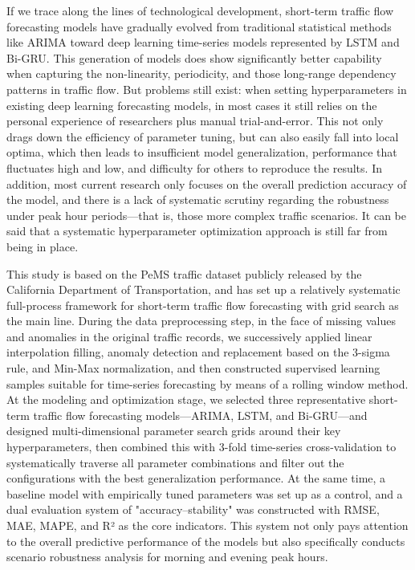 \documentclass[12pt,a4paper,oneside]{ctexbook}
\begin{document}
	If we trace along the lines of technological development, short-term traffic flow forecasting models have gradually evolved from traditional statistical methods like ARIMA toward deep learning time-series models represented by LSTM and Bi-GRU. This generation of models does show significantly better capability when capturing the non-linearity, periodicity, and those long-range dependency patterns in traffic flow. But problems still exist: when setting hyperparameters in existing deep learning forecasting models, in most cases it still relies on the personal experience of researchers plus manual trial-and-error. This not only drags down the efficiency of parameter tuning, but can also easily fall into local optima, which then leads to insufficient model generalization, performance that fluctuates high and low, and difficulty for others to reproduce the results. In addition, most current research only focuses on the overall prediction accuracy of the model, and there is a lack of systematic scrutiny regarding the robustness under peak hour periods—that is, those more complex traffic scenarios. It can be said that a systematic hyperparameter optimization approach is still far from being in place.
	
	This study is based on the PeMS traffic dataset publicly released by the California Department of Transportation, and has set up a relatively systematic full-process framework for short-term traffic flow forecasting with grid search as the main line. During the data preprocessing step, in the face of missing values and anomalies in the original traffic records, we successively applied linear interpolation filling, anomaly detection and replacement based on the 3-sigma rule, and Min-Max normalization, and then constructed supervised learning samples suitable for time-series forecasting by means of a rolling window method. At the modeling and optimization stage, we selected three representative short-term traffic flow forecasting models—ARIMA, LSTM, and Bi-GRU—and designed multi-dimensional parameter search grids around their key hyperparameters, then combined this with 3-fold time-series cross-validation to systematically traverse all parameter combinations and filter out the configurations with the best generalization performance. At the same time, a baseline model with empirically tuned parameters was set up as a control, and a dual evaluation system of "accuracy–stability" was constructed with RMSE, MAE, MAPE, and R² as the core indicators. This system not only pays attention to the overall predictive performance of the models but also specifically conducts scenario robustness analysis for morning and evening peak hours.
	
\end{document}
